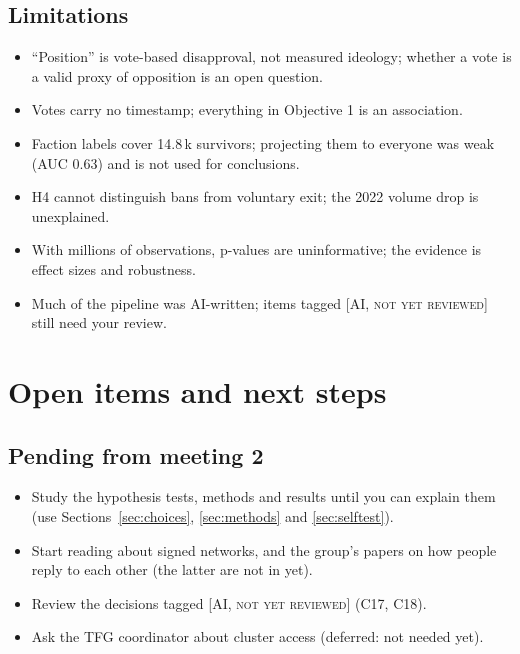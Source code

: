 \documentclass[11pt,a4paper]{article}
\newcommand{\file}[1]{\path{#1}}
\newcommand{\status}[1]{\textsc{\small #1}}
\begin{document}
\subsection{Limitations}
\begin{itemize}
  \item ``Position'' is vote-based disapproval, not measured ideology; whether a vote is a valid proxy of opposition is an open question.
  \item Votes carry no timestamp; everything in Objective 1 is an association.
  \item Faction labels cover 14.8\,k survivors; projecting them to everyone was weak (AUC 0.63) and is not used for conclusions.
  \item H4 cannot distinguish bans from voluntary exit; the 2022 volume drop is unexplained.
  \item With millions of observations, p-values are uninformative; the evidence is effect sizes and robustness.
  \item Much of the pipeline was AI-written; items tagged \status{[AI, not yet reviewed]} still need your review.
\end{itemize}

\section{Open items and next steps}\label{sec:next}
\subsection{Pending from meeting 2}
\begin{itemize}[label=$\square$]
  \item Study the hypothesis tests, methods and results until you can explain them (use Sections~\ref{sec:choices}, \ref{sec:methods} and \ref{sec:selftest}).
  \item Start reading about signed networks, and the group's papers on how people reply to each other (the latter are not in \file{notes/papers/} yet).
  \item Review the decisions tagged \status{[AI, not yet reviewed]} (C17, C18).
  \item Ask the TFG coordinator about cluster access (deferred: not needed yet).
\end{itemize}
\end{document}
